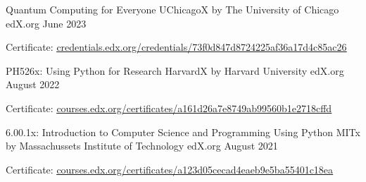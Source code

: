 

\begin{cventries}

  \cventry
    {Quantum Computing for Everyone} %
    {UChicagoX by The University of Chicago} %
    {edX.org} %
    {June 2023} %
    {
      \begin{cvitems} %
        \item{Certificate: \href{https://credentials.edx.org/credentials/73f0d847d8724225af36a17d4c85ac26/}{\underline{credentials.edx.org/credentials/73f0d847d8724225af36a17d4c85ac26}}}
      \end{cvitems}
    }


  \cventry
    {PH526x: Using Python for Research} %
    {HarvardX by Harvard University} %
    {edX.org} %
    {August 2022} %
    {
      \begin{cvitems} %
        \item{Certificate: \href{https://courses.edx.org/certificates/a161d26a7e8749ab99560b1e2718cffd}{\underline{courses.edx.org/certificates/a161d26a7e8749ab99560b1e2718cffd}}}
      \end{cvitems}
    }

  \cventry
    {6.00.1x: Introduction to Computer Science and Programming Using Python} %
    {MITx by Massachussets Institute of Technology} %
    {edX.org} %
    {August 2021} %
    {
      \begin{cvitems} %
        \item{Certificate: \href{https://courses.edx.org/certificates/a123d05cecad4eaeb9e5ba55401c18ea}{\underline{courses.edx.org/certificates/a123d05cecad4eaeb9e5ba55401c18ea}}}
      \end{cvitems}
    }

\end{cventries}
